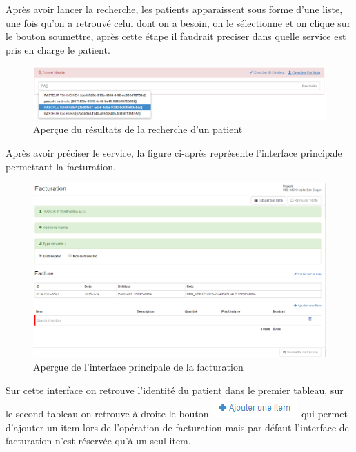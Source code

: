 \documentclass[12pt,a4paper]{report}
\begin{document}
Après avoir lancer la recherche, les patients apparaissent sous forme d'une liste, une fois qu'on a retrouvé celui dont on a besoin, on le sélectionne et on clique sur le bouton soumettre, après cette étape il faudrait preciser dans quelle service est pris en charge le patient.

\begin{figure}[h]
\begin{center}
\includegraphics[width=14cm]{pic/PatientTrouver.png}
\end{center}
\caption{Aperçue du résultats de la recherche d'un patient}
\label{Aperçue du résultats de la recherche d'un patient}
\end{figure}
Après avoir préciser le service, la figure ci-après représente l'interface principale permettant la facturation.

\begin{figure}[h]
\begin{center}
\includegraphics[width=14cm]{pic/FacturationInterface.png}
\end{center}
\caption{Aperçue de l'interface principale de la facturation}
\label{Aperçue de l'interface principale de la facturation}
\end{figure}

Sur cette interface on retrouve l'identité du patient dans le premier tableau, sur le second tableau on retrouve à droite le bouton \includegraphics[scale=0.7]{pic/AjouterItem.png} qui permet d'ajouter un item lors de l'opération de facturation mais par défaut l'interface de facturation n'est réservée qu'à un seul item.
\end{document}
